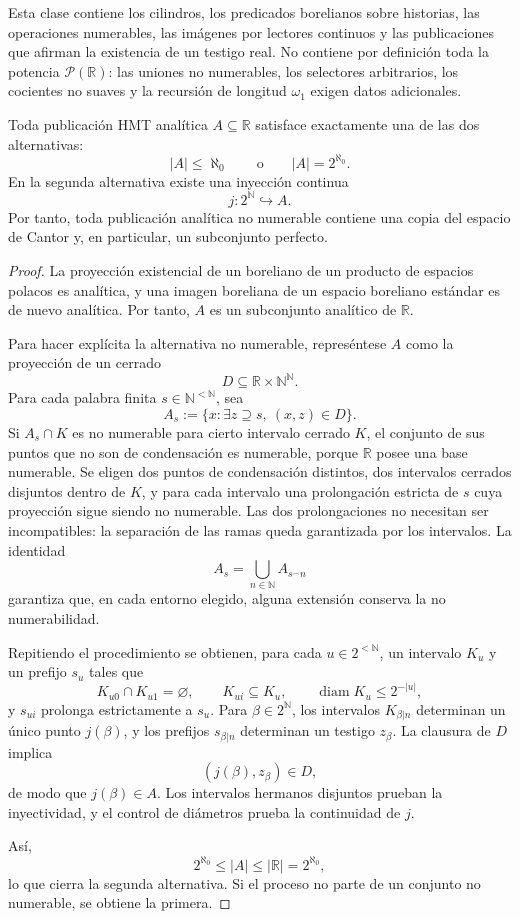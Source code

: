 Esta clase contiene los cilindros, los predicados borelianos sobre
historias, las operaciones numerables, las imágenes por lectores continuos
y las publicaciones que afirman la existencia de un testigo real. No
contiene por definición toda la potencia \(\mathcal P(\mathbb R)\): las
uniones no numerables, los selectores arbitrarios, los cocientes no suaves y
la recursión de longitud \(\omega_1\) exigen datos adicionales.

\begin{theorem}
\label{p12-83-c19-s1:hmtch:thm-dicotomia-perfecta}
Toda publicación HMT analítica \(A\subseteq\mathbb R\) satisface exactamente
una de las dos alternativas:
\[
 |A|\leq\aleph_0
 \qquad\text{o}\qquad
 |A|=2^{\aleph_0}.
\]
En la segunda alternativa existe una inyección continua
\[
 j:2^{\mathbb N}\hookrightarrow A.
\]
Por tanto, toda publicación analítica no numerable contiene una copia del
espacio de Cantor y, en particular, un subconjunto perfecto.
\end{theorem}

\begin{proof}
La proyección existencial de un boreliano de un producto de espacios polacos
es analítica, y una imagen boreliana de un espacio boreliano estándar es de
nuevo analítica. Por tanto, \(A\) es un subconjunto analítico de
\(\mathbb R\).

Para hacer explícita la alternativa no numerable, represéntese \(A\) como
la proyección de un cerrado
\[
 D\subseteq\mathbb R\times\mathbb N^{\mathbb N}.
\]
Para cada palabra finita \(s\in\mathbb N^{<\mathbb N}\), sea
\[
 A_s:=\{x:\exists z\supseteq s,\ (x,z)\in D\}.
\]
Si \(A_s\cap K\) es no numerable para cierto intervalo cerrado \(K\), el
conjunto de sus puntos que no son de condensación es numerable, porque
\(\mathbb R\) posee una base numerable. Se eligen dos puntos de condensación
distintos, dos intervalos cerrados disjuntos dentro de \(K\), y para cada
intervalo una prolongación estricta de \(s\) cuya proyección sigue siendo no
numerable. Las dos prolongaciones no necesitan ser incompatibles: la
separación de las ramas queda garantizada por los intervalos. La identidad
\[
 A_s=\bigcup_{n\in\mathbb N}A_{s^\frown n}
\]
garantiza que, en cada entorno elegido, alguna extensión conserva la no
numerabilidad.

Repitiendo el procedimiento se obtienen, para cada
\(u\in2^{<\mathbb N}\), un intervalo \(K_u\) y un prefijo \(s_u\) tales que
\[
 K_{u0}\cap K_{u1}=\varnothing,
 \qquad
 K_{ui}\subseteq K_u,
 \qquad
 \operatorname{diam}K_u\leq2^{-|u|},
\]
y \(s_{ui}\) prolonga estrictamente a \(s_u\). Para
\(\beta\in2^{\mathbb N}\), los intervalos
\(K_{\beta|n}\) determinan un único punto \(j(\beta)\), y los prefijos
\(s_{\beta|n}\) determinan un testigo \(z_\beta\). La clausura de \(D\)
implica
\[
 (j(\beta),z_\beta)\in D,
\]
de modo que \(j(\beta)\in A\). Los intervalos hermanos disjuntos prueban la
inyectividad, y el control de diámetros prueba la continuidad de \(j\).

Así,
\[
 2^{\aleph_0}\leq |A|\leq|\mathbb R|=2^{\aleph_0},
\]
lo que cierra la segunda alternativa. Si el proceso no parte de un conjunto
no numerable, se obtiene la primera.
\end{proof}

